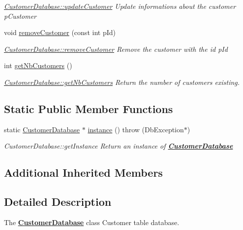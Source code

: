 \begin{DoxyCompactItemize}
\begin{DoxyCompactList}\small\item\em \hyperlink{classDatabase_1_1CustomerDatabase_a8408b97565455420fe062b5d62c19088}{Customer\+Database\+::update\+Customer} Update informations about the customer {\itshape p\+Customer} \end{DoxyCompactList}\item 
void \hyperlink{classDatabase_1_1CustomerDatabase_ad19fe8efe5e718aba97c9b1a606553c7}{remove\+Customer} (const int p\+Id)
\begin{DoxyCompactList}\small\item\em \hyperlink{classDatabase_1_1CustomerDatabase_ad19fe8efe5e718aba97c9b1a606553c7}{Customer\+Database\+::remove\+Customer} Remove the customer with the id {\itshape p\+Id} \end{DoxyCompactList}\item 
int \hyperlink{classDatabase_1_1CustomerDatabase_a73d49c62c59c63607d3b1bf9c03328cb}{get\+Nb\+Customers} ()
\begin{DoxyCompactList}\small\item\em \hyperlink{classDatabase_1_1CustomerDatabase_a73d49c62c59c63607d3b1bf9c03328cb}{Customer\+Database\+::get\+Nb\+Customers} Return the number of customers existing. \end{DoxyCompactList}\end{DoxyCompactItemize}
\subsection*{Static Public Member Functions}
\begin{DoxyCompactItemize}
\item 
static \hyperlink{classDatabase_1_1CustomerDatabase}{Customer\+Database} $\ast$ \hyperlink{classDatabase_1_1CustomerDatabase_adfa3f1c75bedb1b0112c06ddc1418f77}{instance} ()  throw (\+Db\+Exception$\ast$)
\begin{DoxyCompactList}\small\item\em Customer\+Database\+::get\+Instance Return an instance of {\bfseries \hyperlink{classDatabase_1_1CustomerDatabase}{Customer\+Database}} \end{DoxyCompactList}\end{DoxyCompactItemize}
\subsection*{Additional Inherited Members}


\subsection{Detailed Description}
The {\bfseries \hyperlink{classDatabase_1_1CustomerDatabase}{Customer\+Database}} class Customer table database. 

